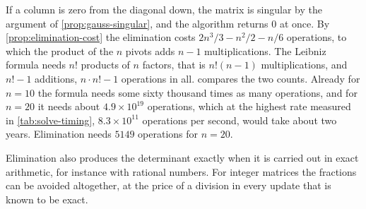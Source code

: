 If a column is zero from the diagonal down, the matrix is singular by the argument of \cref{prop:gauss-singular}, and the algorithm returns $0$ at once. By \cref{prop:elimination-cost} the elimination costs $2n^3/3-n^2/2-n/6$ operations, to which the product of the $n$ pivots adds $n-1$ multiplications. The Leibniz formula needs $n!$ products of $n$ factors, that is $n!(n-1)$ multiplications, and $n!-1$ additions, $n\cdot n!-1$ operations in all.  compares the two counts. Already for $n=10$ the formula needs some sixty thousand times as many operations, and for $n=20$ it needs about $4.9\times10^{19}$ operations, which at the highest rate measured in \cref{tab:solve-timing}, $8.3\times10^{11}$ operations per second, would take about two years. Elimination needs $5149$ operations for $n=20$.

\begin{table}
\end{table}

Elimination also produces the determinant exactly when it is carried out in exact arithmetic, for instance with rational numbers. For integer matrices the fractions can be avoided altogether, at the price of a division in every update that is known to be exact.

